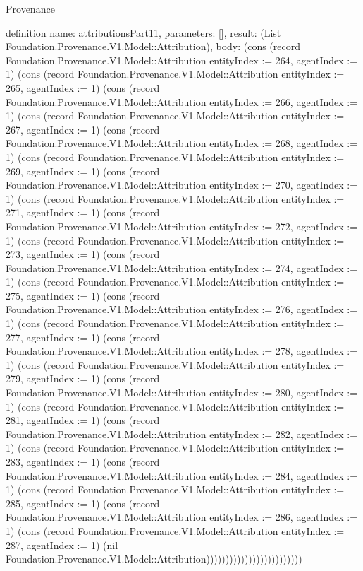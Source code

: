 \begin{lexlean}{Provenance}
\begin{semanticmodule}
definition{
  name: attributionsPart11,
  parameters: [],
  result: (List Foundation.Provenance.V1.Model::Attribution),
  body: (cons (record Foundation.Provenance.V1.Model::Attribution {entityIndex := 264, agentIndex := 1}) (cons (record Foundation.Provenance.V1.Model::Attribution {entityIndex := 265, agentIndex := 1}) (cons (record Foundation.Provenance.V1.Model::Attribution {entityIndex := 266, agentIndex := 1}) (cons (record Foundation.Provenance.V1.Model::Attribution {entityIndex := 267, agentIndex := 1}) (cons (record Foundation.Provenance.V1.Model::Attribution {entityIndex := 268, agentIndex := 1}) (cons (record Foundation.Provenance.V1.Model::Attribution {entityIndex := 269, agentIndex := 1}) (cons (record Foundation.Provenance.V1.Model::Attribution {entityIndex := 270, agentIndex := 1}) (cons (record Foundation.Provenance.V1.Model::Attribution {entityIndex := 271, agentIndex := 1}) (cons (record Foundation.Provenance.V1.Model::Attribution {entityIndex := 272, agentIndex := 1}) (cons (record Foundation.Provenance.V1.Model::Attribution {entityIndex := 273, agentIndex := 1}) (cons (record Foundation.Provenance.V1.Model::Attribution {entityIndex := 274, agentIndex := 1}) (cons (record Foundation.Provenance.V1.Model::Attribution {entityIndex := 275, agentIndex := 1}) (cons (record Foundation.Provenance.V1.Model::Attribution {entityIndex := 276, agentIndex := 1}) (cons (record Foundation.Provenance.V1.Model::Attribution {entityIndex := 277, agentIndex := 1}) (cons (record Foundation.Provenance.V1.Model::Attribution {entityIndex := 278, agentIndex := 1}) (cons (record Foundation.Provenance.V1.Model::Attribution {entityIndex := 279, agentIndex := 1}) (cons (record Foundation.Provenance.V1.Model::Attribution {entityIndex := 280, agentIndex := 1}) (cons (record Foundation.Provenance.V1.Model::Attribution {entityIndex := 281, agentIndex := 1}) (cons (record Foundation.Provenance.V1.Model::Attribution {entityIndex := 282, agentIndex := 1}) (cons (record Foundation.Provenance.V1.Model::Attribution {entityIndex := 283, agentIndex := 1}) (cons (record Foundation.Provenance.V1.Model::Attribution {entityIndex := 284, agentIndex := 1}) (cons (record Foundation.Provenance.V1.Model::Attribution {entityIndex := 285, agentIndex := 1}) (cons (record Foundation.Provenance.V1.Model::Attribution {entityIndex := 286, agentIndex := 1}) (cons (record Foundation.Provenance.V1.Model::Attribution {entityIndex := 287, agentIndex := 1}) (nil Foundation.Provenance.V1.Model::Attribution)))))))))))))))))))))))))
}


\end{semanticmodule}
\end{lexlean}
